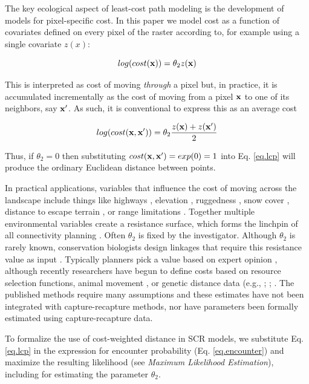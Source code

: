 \documentclass[12pt]{article}
\begin{document}
\begin{spacing}{1.8}
The key ecological aspect of least-cost path modeling is the
development
of models for pixel-specific cost.
In this paper we model cost as a function of covariates
defined on every pixel of the raster according to, for example using a
single covariate $z(x)$:

\begin{equation}
 log(cost({\bf x}))=  \theta_{2} z({\bf x})
\label{eq.cost}
\end{equation}

{\flushleft This} is interpreted as cost of moving {\it through} a
pixel but, in practice, it is accumulated incrementally as the cost of
moving from a pixel ${\bf x}$ to one of its neighbors, say ${\bf
  x}'$. As such, it is conventional to express this as an average cost

\[
 log(cost({\bf x},{\bf x}'))=  \theta_{2} \frac{z({\bf x})+z({\bf x}')}{2}
\]

{\flushleft
Thus,} if $\theta_{2} = 0$ then substituting $cost({\bf x},{\bf x}')
=exp(0) = 1$ into
Eq. \ref{eq.lcp} will produce the ordinary Euclidean distance
between points.

In practical applications, variables that influence the cost of moving
across the landscape include things like highways
\citep[e.g.,][]{epps_etal:2005}, elevation \citep{cushman_etal:2006},
ruggedness \citep{epps_etal:2007}, snow cover
\citep{schwartz_etal:2009}, distance to escape terrain
\citep{shirk_etal:2010}, or range limitations
\citep{mcrae_beier:2007}.  Together multiple environmental variables
create a resistance surface, which forms the linchpin of all
connectivity planning \citep{spear_etal:2010}.  Often $\theta_{2}$ is
fixed by the investigator. Although $\theta_{2}$ is rarely known,
conservation biologists design linkages that require this resistance
value as input \citep[see][and articles cited
therein]{beier_etal:2008}.  Typically planners pick a value based on
expert opinion \citep{beier_etal:2008}, although recently researchers
have begun to define costs based on resource selection functions,
animal movement \citep{tracy:2006, fortin_etal:2005}, or genetic
distance data (e.g., \citet{gerlach_musolf:2000};
\citet{epps_etal:2007}; \citet{schwartz_etal:2009}. The published
methods require many assumptions and these estimates have not been
integrated with capture-recapture methods, nor have parameters been
formally estimated using capture-recapture data.

To formalize the use of cost-weighted distance in SCR models, we
substitute Eq. \ref{eq.lcp} in the expression for encounter
probability (Eq. \ref{eq.encounter}) and maximize the resulting
likelihood (see {\it Maximum Likelihood Estimation}), including for estimating the
parameter $\theta_{2}$.



\end{spacing}
\end{document}
